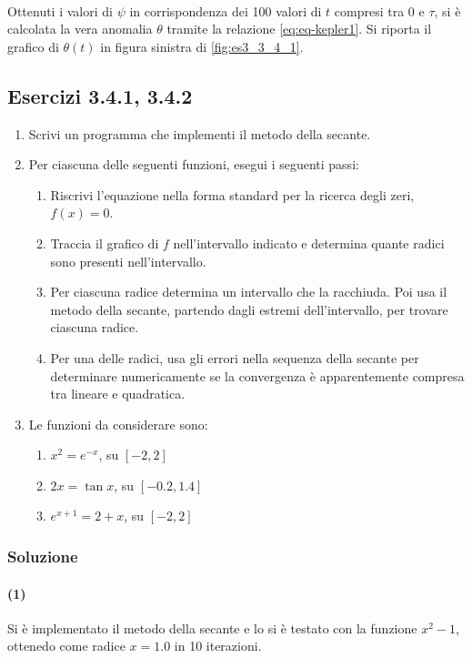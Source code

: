 \documentclass[letterpaper, 12pt]{article}
\numberwithin{equation}{section}    %
\begin{document}
\\
Ottenuti i valori di $\psi$ in corrispondenza dei 100 valori di $t$ compresi tra $0$ e $\tau$, si è calcolata
la vera anomalia $\theta$ tramite la relazione \ref{eq:eq-kepler1}. Si riporta il grafico di $\theta(t)$ in
figura sinistra di \ref{fig:es3_3_4_1}.

\subsection{Esercizi 3.4.1, 3.4.2}

\begin{enumerate}
    \item Scrivi un programma che implementi il metodo della secante.
    \item Per ciascuna delle seguenti funzioni, esegui i seguenti passi:
    \begin{enumerate}
        \item Riscrivi l'equazione nella forma standard per la ricerca degli zeri, $f(x) = 0$.
        \item Traccia il grafico di $f$ nell'intervallo indicato e determina quante radici sono presenti nell'intervallo.
        \item Per ciascuna radice determina un intervallo che la racchiuda. Poi usa il metodo della secante, partendo dagli estremi dell'intervallo, per trovare ciascuna radice.
        \item Per una delle radici, usa gli errori nella sequenza della secante per determinare numericamente se la convergenza è apparentemente compresa tra lineare e quadratica.
    \end{enumerate}
    \item Le funzioni da considerare sono:
    \begin{enumerate}
        \item $x^2 = e^{-x}$, su $[-2,2]$
        \item $2x = \tan x$, su $[-0.2,1.4]$
        \item $e^{x+1} = 2 + x$, su $[-2,2]$
    \end{enumerate}
\end{enumerate}

\subsubsection{Soluzione}
\paragraph{(1)} Si è implementato il metodo della secante e lo si è testato con la funzione $x^2 - 1$, 
ottenedo come radice $x = 1.0$ in 10 iterazioni. 
\end{document}
